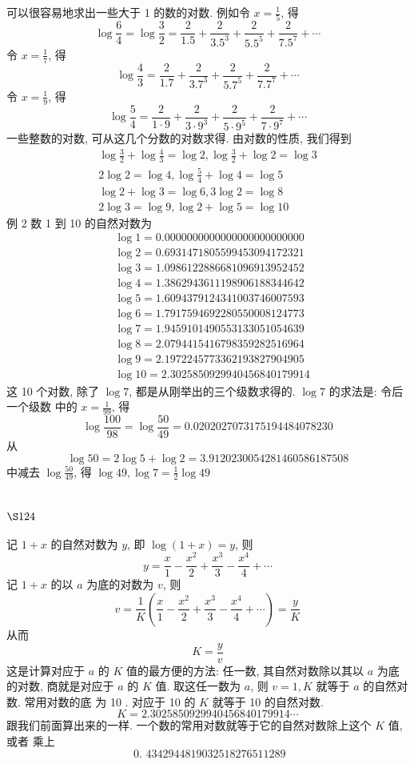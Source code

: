 可以很容易地求出一些大于 1 的数的对数. 例如令 $x=\frac{1}{5}$, 得
\[
\log \frac{6}{4}=\log \frac{3}{2}=\frac{2}{1.5}+\frac{2}{3.5^{3}}+\frac{2}{5.5^{5}}+\frac{2}{7.5^{7}}+\cdots
\]
令 $x=\frac{1}{7}$, 得
\[
\log \frac{4}{3}=\frac{2}{1.7}+\frac{2}{3.7^{3}}+\frac{2}{5.7^{5}}+\frac{2}{7.7^{7}}+\cdots
\]
令 $x=\frac{1}{9}$, 得
\[
\log \frac{5}{4}=\frac{2}{1 \cdot 9}+\frac{2}{3 \cdot 9^{3}}+\frac{2}{5 \cdot 9^{5}}+\frac{2}{7 \cdot 9^{7}}+\cdots
\]
一些整数的对数, 可从这几个分数的对数求得. 由对数的性质, 我们得到
\[
\begin{gathered}
\log \frac{3}{2}+\log \frac{4}{3}=\log 2, \log \frac{3}{2}+\log 2=\log 3 \\
2 \log 2=\log 4, \log \frac{5}{4}+\log 4=\log 5 \\
\log 2+\log 3=\log 6,3 \log 2=\log 8 \\
2 \log 3=\log 9, \log 2+\log 5=\log 10
\end{gathered}
\]
例 2 数 1 到 10 的自然对数为
\[
\begin{aligned}
& \log 1=0.0000000000000000000000000 \\
& \log 2=0.6931471805599453094172321 \\
& \log 3=1.0986122886681096913952452 \\
& \log 4=1.3862943611198906188344642 \\
& \log 5=1.6094379124341003746007593 \\
& \log 6=1.7917594692280550008124773 \\
& \log 7=1.9459101490553133051054639 \\
& \log 8=2.0794415416798359282516964 \\
& \log 9=2.1972245773362193827904905 \\
& \log 10=2.3025850929940456840179914
\end{aligned}
\]
这 10 个对数, 除了 $\log 7$, 都是从刚举出的三个级数求得的. $\log 7$ 的求法是: 令后一个级数 中的 $x=\frac{1}{99}$, 得
\[
\log \frac{100}{98}=\log \frac{50}{49}=0.0202027073175194484078230
\]
从
\[
\log 50=2 \log 5+\log 2=3.9120230054281460586187508
\]
中减去 $\log \frac{50}{49}$, 得 $\log 49, \log 7=\frac{1}{2} \log 49$ 

\section{$\S 124$}

记 $1+x$ 的自然对数为 $y$, 即 $\log (1+x)=y$, 则
\[
y=\frac{x}{1}-\frac{x^{2}}{2}+\frac{x^{3}}{3}-\frac{x^{4}}{4}+\cdots
\]
记 $1+x$ 的以 $a$ 为底的对数为 $v$, 则
\[
v=\frac{1}{K}\left(\frac{x}{1}-\frac{x^{2}}{2}+\frac{x^{3}}{3}-\frac{x^{4}}{4}+\cdots\right)=\frac{y}{K}
\]
从而
\[
K=\frac{y}{v}
\]
这是计算对应于 $a$ 的 $K$ 值的最方便的方法: 任一数, 其自然对数除以其以 $a$ 为底的对数, 商就是对应于 $a$ 的 $K$ 值. 取这任一数为 $a$, 则 $v=1, K$ 就等于 $a$ 的自然对数. 常用对数的底 为 10 . 对应于 10 的 $K$ 就等于 10 的自然对数.
\[
K=2.3025850929940456840179914 \cdots
\]
跟我们前面算出来的一样. 一个数的常用对数就等于它的自然对数除上这个 $K$ 值, 或者 乘上
\[
\text { 0. } 4342944819032518276511289
\]
